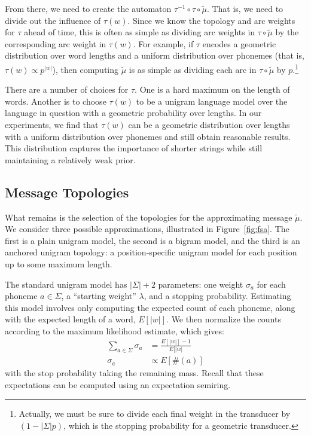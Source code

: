 \documentclass[11pt,a4paper]{article}
\begin{document}
From there, we need to create the automaton $\tau^{-1}
\circ\tau\circ\tilde\mu$. That is, we need to divide out the influence
of $\tau(w)$. Since we know the topology and arc weights for $\tau$
ahead of time, this is often as simple as dividing arc weights in
$\tau\circ\tilde\mu$ by the corresponding arc weight in $\tau(w)$.
For example, if $\tau$ encodes a geometric distribution over word
lengths and a uniform distribution over phonemes (that is, $\tau(w)
\propto {p^{|w|}}$), then computing $\tilde\mu$ is as simple as
dividing each arc in $\tau\circ\tilde\mu$ by $p$.\footnote{Actually,
we must be sure to divide each final weight in the transducer
by $(1-|\Sigma| p)$, which is the stopping probability for a geometric
transducer.}

There are a number of choices for $\tau$. One is a hard maximum on
the length of words. Another is to choose $\tau(w)$ to be a unigram
language model over the language in question with a geometric
probability over lengths. In our experiments, we find that $\tau(w)$
can be a geometric distribution over lengths with a uniform
distribution over phonemes and still obtain reasonable results.
This distribution captures the importance of shorter strings while
still maintaining a relatively weak prior.

\subsection{Message Topologies}

What remains is the selection of the topologies for the approximating
message $\tilde\mu$. We consider three possible approximations,
illustrated in Figure~\ref{fig:fsa}. The first is a plain unigram
model, the second is a bigram model, and the third is an anchored
unigram topology: a position-specific unigram model for each position
up to some maximum length.

The standard unigram model has $|\Sigma|+2$ parameters:
one weight $\sigma_a$ for each phoneme $a \in \Sigma$, a ``starting
weight'' $\lambda$, and a stopping probability. Estimating this
model involves only computing the expected count of each phoneme,
along with the expected length of a word, $E[|w|]$. We then normalize
the counts according to the maximum likelihood estimate, which
gives: 
\begin{equation*}
  \begin{split}
    \sum_{a\in\Sigma} \sigma_a &= \frac{E[|w|]-1}{E[|w|} \\
    \sigma_a &\propto E[\#(a)]
   \end{split}
 \end{equation*}
with the stop probability taking the remaining mass. Recall that
these expectations can be computed using an expectation semiring.
\end{document}
